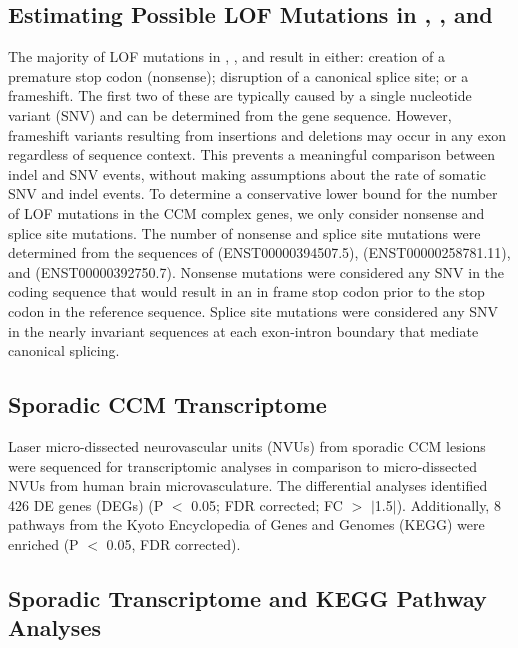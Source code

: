 \subsection{Estimating Possible LOF Mutations in , , and }
The majority of LOF mutations in , , and  result in either: creation of a premature stop codon (nonsense); disruption of a canonical splice site; or a frameshift. The first two of these are typically caused by a single nucleotide variant (SNV) and can be determined from the gene sequence. However, frameshift variants resulting from insertions and deletions may occur in any exon regardless of sequence context. This prevents a meaningful comparison between indel and SNV events, without making assumptions about the rate of somatic SNV and indel events. To determine a conservative lower bound for the number of LOF mutations in the CCM complex genes, we only consider nonsense and splice site mutations. The number of nonsense and splice site mutations were determined from the sequences of  (ENST00000394507.5),  (ENST00000258781.11), and  (ENST00000392750.7). Nonsense mutations were considered any SNV in the coding sequence that would result in an in frame stop codon prior to the stop codon in the reference sequence. Splice site mutations were considered any SNV in the nearly invariant sequences at each exon-intron boundary that mediate canonical splicing. 
	
\subsection{Sporadic CCM Transcriptome}
Laser micro-dissected neurovascular units (NVUs) from sporadic CCM lesions were sequenced for transcriptomic analyses in comparison to micro-dissected NVUs from human brain microvasculature. The differential analyses identified 426 DE genes (DEGs) (P $<$ 0.05; FDR corrected; FC $>$ $\vert$1.5$\vert$). Additionally, 8 pathways from the Kyoto Encyclopedia of Genes and Genomes (KEGG) were enriched (P $<$ 0.05, FDR corrected).  


\subsection{Sporadic Transcriptome and KEGG Pathway Analyses}

